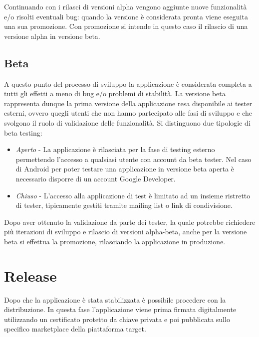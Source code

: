 Continuando con i rilasci di versioni alpha vengono aggiunte nuove funzionalità e/o risolti eventuali bug: quando la versione è considerata pronta viene eseguita una sua promozione. Con promozione si intende in questo caso il rilascio di una versione alpha in versione beta.

\subsection{Beta}
A questo punto del processo di sviluppo la applicazione è considerata completa a tutti gli effetti a meno di bug e/o problemi di stabilità. La versione beta rappresenta dunque la prima versione della applicazione resa disponibile ai tester esterni, ovvero quegli utenti che non hanno partecipato alle fasi di sviluppo e che svolgono il ruolo di validazione delle funzionalità. Si distinguono due tipologie di beta testing:
\begin{itemize}
    \item \textit{Aperto} - La applicazione è rilasciata per la fase di testing esterno permettendo l'accesso a qualsiasi utente con account da beta tester. Nel caso di Android per poter testare una applicazione in versione beta aperta è necessario disporre di un account Google Developer.
    \item \textit{Chiuso} - L'accesso alla applicazione di test è limitato ad un insieme ristretto di tester, tipicamente gestiti tramite mailing list o link di condivisione.
\end{itemize}
Dopo aver ottenuto la validazione da parte dei tester, la quale potrebbe richiedere più iterazioni di sviluppo e rilascio di versioni alpha-beta, anche per la versione beta si effettua la promozione, rilasciando la applicazione in produzione.

\section{Release}
Dopo che la applicazione è stata stabilizzata è possibile procedere con la distribuzione. In questa fase l'applicazione viene prima firmata digitalmente utilizzando un certificato protetto da chiave privata e poi pubblicata sullo specifico marketplace della piattaforma target.

